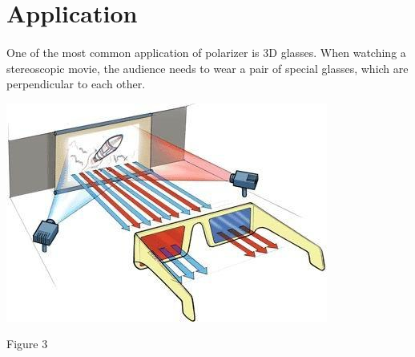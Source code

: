 \documentclass[]{report}
\begin{document}
\section*{Application}
\paragraph{} One of the most common application of polarizer is 3D glasses. When watching a stereoscopic movie, the audience needs to wear a pair of special glasses, which are perpendicular to each other.\newline\newline
\centerline{\includegraphics[scale=0.6]{figure4.jpg}}\newline
\centerline{Figure 3}
\end{document}
